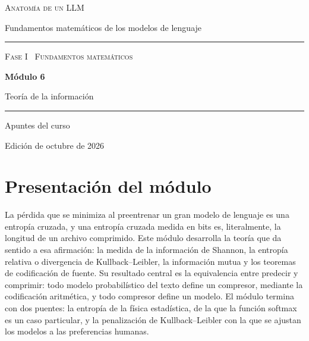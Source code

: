 \documentclass[11pt,a4paper,twoside,openany]{book}
\begin{document}
\frontmatter
\begin{titlepage}
\centering
\vspace*{2.5cm}
{\large\scshape Anatomía de un LLM}\par
\vspace{0.4cm}
{\normalsize Fundamentos matemáticos de los modelos de lenguaje}\par
\vspace{2.2cm}
\rule{\textwidth}{0.8pt}\par\vspace{0.5cm}
{\small\scshape Fase I \textperiodcentered\ Fundamentos matemáticos}\par\vspace{0.3cm}
{\Huge\bfseries Módulo 6\par}\vspace{0.3cm}
{\LARGE Teoría de la información\par}
\vspace{0.5cm}\rule{\textwidth}{0.4pt}\par
\vspace{1.6cm}
{\large Apuntes del curso}\par
\vfill
{\small Edición de octubre de 2026}\par
\end{titlepage}

\chapter*{Presentación del módulo}

La pérdida que se minimiza al preentrenar un gran modelo de lenguaje es una entropía cruzada, y una entropía cruzada medida en bits es, literalmente, la longitud de un archivo comprimido. Este módulo desarrolla la teoría que da sentido a esa afirmación: la medida de la información de Shannon, la entropía relativa o divergencia de Kullback--Leibler, la información mutua y los teoremas de codificación de fuente. Su resultado central es la equivalencia entre predecir y comprimir: todo modelo probabilístico del texto define un compresor, mediante la codificación aritmética, y todo compresor define un modelo. El módulo termina con dos puentes: la entropía de la física estadística, de la que la función softmax es un caso particular, y la penalización de Kullback--Leibler con la que se ajustan los modelos a las preferencias humanas.
\end{document}
